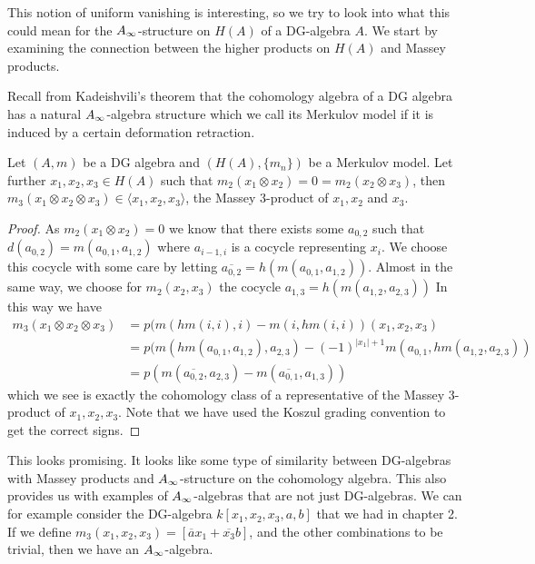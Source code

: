 
This notion of uniform vanishing is interesting, so we try to look into what this could mean for the $A_{\infty}$-structure on $H(A)$ of a DG-algebra $A$. We start by examining the connection between the higher products on $H(A)$ and Massey products. 

Recall from Kadeishvili's theorem that the cohomology algebra of a DG algebra has a natural $A_{\infty}$-algebra structure which we call its Merkulov model if it is induced by a certain deformation retraction.

\begin{lemma}
Let $(A, m)$ be a DG algebra and $(H(A), \{m_n\})$ be a Merkulov model. Let further $x_1, x_2, x_3 \in H(A)$ such that $m_2(x_1\otimes x_2) = 0 = m_2(x_2\otimes x_3)$, then $m_3(x_1 \otimes x_2 \otimes x_3) \in \langle x_1, x_2, x_3 \rangle$, the Massey 3-product of $x_1, x_2$ and $x_3$.  
\end{lemma}
\begin{proof}
As $m_2(x_1 \otimes x_2) = 0$ we know that there exists some $a_{0,2}$ such that $d(a_{0,2}) = m(a_{0,1}, a_{1,2})$ where $a_{i-1, i}$ is a cocycle representing $x_i$. We choose this cocycle with some care by letting $\overline{a_{0,2}} = h(m(a_{0,1}, a_{1,2}))$. Almost in the same way, we choose for $m_2(x_2, x_3)$ the cocycle $a_{1,3} = h(m(a_{1,2}, a_{2,3}))$ In this way we have
\begin{align*}
    m_3(x_1\otimes x_2\otimes x_3) 
    &= p(m(hm(i, i), i)-m(i, hm(i,i))(x_1, x_2, x_3) \\
    &= p(m(hm(a_{0,1}, a_{1,2}), a_{2,3}) - (-1)^{|x_1|+1} m(a_{0,1}, hm(a_{1,2}, a_{2,3})) \\
    &= p(m(\overline{a_{0,2}}, a_{2,3})-m(\overline{a_{0,1}}, a_{1,3}))
\end{align*}
which we see is exactly the cohomology class of a representative of the Massey 3-product of $x_1, x_2, x_3$. Note that we have used the Koszul grading convention to get the correct signs. 
\end{proof}

This looks promising. It looks like some type of similarity between DG-algebras with Massey products and $A_{\infty}$-structure on the cohomology algebra. This also provides us with examples of $A_{\infty}$-algebras that are not just DG-algebras. We can for example consider the DG-algebra $k[x_1, x_2, x_3, a, b]$ that we had in chapter 2. If we define $m_3(x_1, x_2, x_3)=[\overline{a}x_1 + \overline{x_3}b]$, and the other combinations to be trivial, then we have an $A_{\infty}$-algebra.

